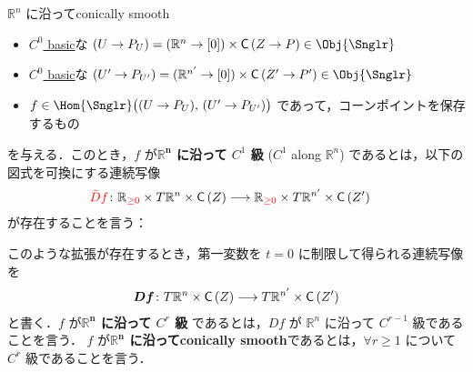\documentclass[TQFT_main]{subfiles}
\begin{document}
\begin{mydef}[label=def:c-smooth-along]{$\mathbb{R}^n$ に沿ってconically smooth}
    \begin{itemize}
        \item \hyperref[def:C0-basic]{$C^0$ basic}な $(U \to P_{U}) = (\mathbb{R}^{n} \to [0]) \times \Cone{Z \to P} \in \Obj{\Snglr}$
        \item \hyperref[def:C0-basic]{$C^0$ basic}な $(U' \to P_{U'}) = (\mathbb{R}^{n'} \to [0]) \times \Cone{Z' \to P'} \in \Obj{\Snglr}$
        \item $f \in \Hom{\Snglr} \bigl( (U \to P_{U}),\, (U' \to P_{U'})  \bigr)$ であって，コーンポイントを保存するもの
    \end{itemize}
    を与える．このとき，$f$ が\textbf{$\bm{\mathbb{R}^n}$ に沿って $C^1$ 級} ($C^1$ along $\mathbb{R}^n$) であるとは，以下の図式を可換にする連続写像
    \begin{align}
        \textcolor{red}{\tilde{D}f} \colon \mathbb{R}_{\textcolor{red}{\ge 0}} \times T \mathbb{R}^n \times \mathsf{C}\left( Z \right) &\longrightarrow \mathbb{R}_{\textcolor{red}{\ge 0}} \times T \mathbb{R}^{n'} \times \mathsf{C}\left( Z' \right)
    \end{align}
    が存在することを言う：
    \begin{center}
    \end{center}
    \tcblower
    このような拡張が存在するとき，第一変数を $t=0$ に制限して得られる連続写像を
    \begin{align}
        \bm{Df} \colon T \mathbb{R}^n \times \mathsf{C}\left( Z \right) \longrightarrow T \mathbb{R}^{n'} \times \mathsf{C}\left( Z' \right)
    \end{align}
    と書く．$f$ が\textbf{$\bm{\mathbb{R}^n}$ に沿って $C^r$ 級} であるとは，$Df$ が $\mathbb{R}^n$ に沿って $C^{r-1}$ 級であることを言う．
    $f$ が\textbf{$\bm{\mathbb{R}^n}$ に沿ってconically smooth}であるとは，$\forall r \ge 1$ について $C^r$ 級であることを言う．
\end{mydef}
\end{document}
